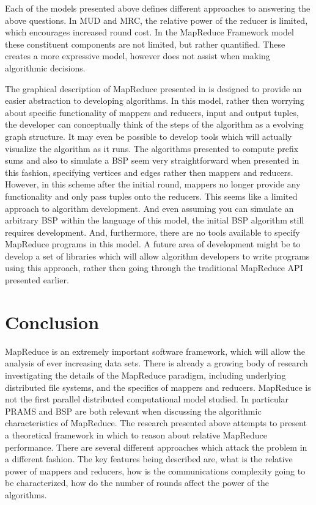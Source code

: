 \documentclass{article}
\begin{document}
Each of the models presented above defines different approaches to answering the above questions. In MUD and MRC, the relative power of the reducer is limited, which encourages increased round cost. In the MapReduce Framework model these constituent components are not limited, but rather quantified. These creates a more expressive model, however does not assist when making algorithmic decisions. 

The graphical description of MapReduce presented in \cite{goodrich} is designed to provide an easier abstraction to developing algorithms. In this model, rather then worrying about specific functionality of mappers and reducers, input and output tuples, the developer can conceptually think of the steps of the algorithm as a evolving graph structure. It may even be possible to develop tools which will actually visualize the algorithm as it runs. The algorithms presented to compute prefix sums and also to simulate a BSP seem very straightforward when presented in this fashion, specifying vertices and edges rather then mappers and reducers. However, in this scheme after the initial round, mappers no longer provide any functionality and only pass tuples onto the reducers. This seems like a limited approach to algorithm development. And even assuming you can simulate an arbitrary BSP within the language of this model, the initial BSP algorithm still requires development. And, furthermore, there are no tools available to specify MapReduce programs in this model. A future area of development might be to develop a set of libraries which will allow algorithm developers to write programs using this approach, rather then going through the traditional MapReduce API presented earlier. 

\section{Conclusion}
MapReduce is an extremely important software framework, which will allow the analysis of ever increasing data sets. There is already a growing body of research investigating the details of the MapReduce paradigm, including underlying distributed file systems, and the specifics of mappers and reducers. MapReduce is not the first parallel distributed computational model studied. In particular PRAMS and BSP are both relevant when discussing the algorithmic characteristics of MapReduce. The research presented above attempts to present a theoretical framework in which to reason about relative MapReduce performance. There are several different approaches which attack the problem in a different fashion. The key features being described are, what is the relative power of mappers and reducers, how is the communications complexity going to be characterized, how do the number of rounds affect the power of the algorithms. 
\end{document}
